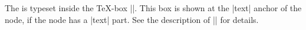 \begin{command}{\pgfnode{}}
\begin{codeexample}[]
\end{codeexample}

  The  is typeset inside the \TeX-box
  |\pgfnodeparttextbox|. This box is shown at the |text| anchor of the
  node, if the node has a |text| part. See the description of
  |\pgfmultipartnode| for details.
\end{command}


